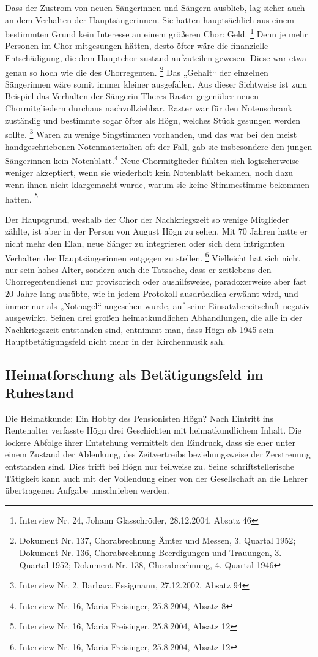 \documentclass[a4paper]{article}
\begin{document}
Dass der Zustrom von neuen Sängerinnen und Sängern ausblieb, lag sicher
auch an dem Verhalten der Hauptsängerinnen. Sie hatten hauptsächlich
aus einem bestimmten Grund kein Interesse an einem größeren Chor:
Geld. \footnote{Interview Nr. 24, Johann Glasschröder, 28.12.2004,
Absatz 46} Denn je mehr Personen im Chor mitgesungen hätten, desto
öfter wäre die finanzielle Entschädigung, die dem Hauptchor zustand
aufzuteilen gewesen. Diese war etwa genau so hoch wie die des
Chorregenten. \footnote{Dokument Nr. 137, Chorabrechnung Ämter und
Messen, 3. Quartal 1952; Dokument Nr. 136, Chorabrechnung Beerdigungen
und Trauungen, 3. Quartal 1952; Dokument Nr. 138, Chorabrechnung, 4.
Quartal 1946} Das „Gehalt“ der einzelnen Sängerinnen wäre somit immer
kleiner ausgefallen. Aus dieser Sichtweise ist zum Beispiel das
Verhalten der Sängerin Theres Raster gegenüber neuen Chormitgliedern
durchaus nachvollziehbar. Raster war für den Notenschrank zuständig und
bestimmte sogar öfter als Högn, welches Stück gesungen werden
sollte. \footnote{Interview Nr. 2, Barbara Essigmann, 27.12.2002,
Absatz 94} Waren zu wenige Singstimmen vorhanden, und das war bei den
meist handgeschriebenen Notenmaterialien oft der Fall, gab sie
insbesondere den jungen Sängerinnen kein Notenblatt.\footnote{
Interview Nr. 16, Maria Freisinger, 25.8.2004, Absatz 8} Neue
Chormitglieder fühlten sich logischerweise weniger akzeptiert, wenn sie
wiederholt kein Notenblatt bekamen, noch dazu wenn ihnen nicht
klargemacht wurde, warum sie keine Stimmestimme bekommen
hatten. \footnote{Interview Nr. 16, Maria Freisinger, 25.8.2004, Absatz
12}

Der Hauptgrund, weshalb der Chor der Nachkriegszeit so wenige Mitglieder
zählte, ist aber in der Person von August Högn zu sehen. Mit 70 Jahren
hatte er nicht mehr den Elan, neue Sänger zu integrieren oder sich dem
intriganten Verhalten der Hauptsängerinnen entgegen zu
stellen. \footnote{Interview Nr. 16, Maria Freisinger, 25.8.2004,
Absatz 12} Vielleicht hat sich nicht nur sein hohes Alter, sondern auch
die Tatsache, dass er zeitlebens den Chorregentendienst nur
provisorisch oder aushilfsweise, paradoxerweise aber fast 20 Jahre lang
ausübte, wie in jedem Protokoll ausdrücklich erwähnt wird, und immer
nur als „Notnagel“ angesehen wurde, auf seine Einsatzbereitschaft
negativ ausgewirkt. Seinen drei großen heimatkundlichen Abhandlungen,
die alle in der Nachkriegszeit entstanden sind, entnimmt man, dass Högn
ab 1945 sein Hauptbetätigungsfeld nicht mehr in der Kirchenmusik sah.

\subsection{Heimatforschung als Betätigungsfeld im Ruhestand}
\hypertarget{RefHeadingToc100333736}{}Die Heimatkunde: Ein Hobby des
Pensionisten Högn? Nach Eintritt ins Rentenalter verfasste Högn drei
Geschichten mit heimatkundlichem Inhalt. Die lockere Abfolge ihrer
Entstehung vermittelt den Eindruck, dass sie eher unter einem Zustand
der Ablenkung, des Zeitvertreibs beziehungsweise der Zerstreuung
entstanden sind. Dies trifft bei Högn nur teilweise zu. Seine
schriftstellerische Tätigkeit kann auch mit der Vollendung einer von
der Gesellschaft an die Lehrer übertragenen Aufgabe umschrieben werden.
\end{document}
